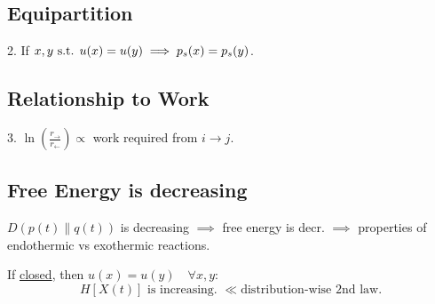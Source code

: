 \subsection{Equipartition}
2. If $x, y\text{ s.t. } u(x)=u(y)\implies p_s(x)=p_s(y)$.

\subsection{Relationship to Work}
3. $\ln(\frac{r_\to}{r_{\leftarrow}})\propto $ work required from $i\to j$.

\subsection{Free Energy is decreasing}
$D(p(t)\|q(t))$ is decreasing $\implies$ free energy is decr. $\implies$ properties of endothermic vs exothermic reactions.

If \underline{closed}, then $u(x)=u(y)\quad\forall x, y$:
\begin{equation}
    H[X(t)] \text{ is increasing. } \ll \text{distribution-wise 2nd law.}
\end{equation}
